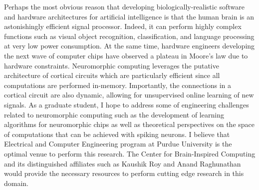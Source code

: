 \documentclass{article}
\begin{document}
\indent Perhaps the most obvious reason that developing biologically-realistic software and hardware architectures for artificial intelligence is that the human brain is an astonishingly efficient signal processor. Indeed, it can perform highly complex functions such as visual object recognition, classification, and language processing at very low power consumption. At the same time, hardware engineers developing the next wave of computer chips have observed a plateau in Moore's law due to hardware constraints. Neuromorphic computing leverages the putative architecture of cortical circuits which are particularly efficient since all computations are performed in-memory. Importantly, the connections in a cortical circuit are also dynamic, allowing for unsupervised online learning of new signals. As a graduate student, I hope to address some of engineering challenges related to neuromorphic computing such as the development of learning algorithms for neuromorphic chips as well as theoretical perspectives on the space of computations that can be achieved with spiking neurons. I believe that Electrical and Computer Engineering program at Purdue University is the optimal venue to perform this research. The Center for Brain-Inspired Computing and its distinguished affiliates such as Kaushik Roy and Anand Raghunathan would provide the necessary resources to perform cutting edge research in this domain.\\
\end{document}
